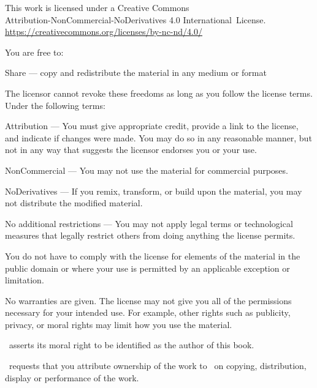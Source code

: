 \cleartorecto
\thispagestyle{plain}

\vspace*{-3\onelineskip}

{\fontsize{8}{10.5}\selectfont%
\setlength{\parindent}{0pt}%
\raggedright\label{copyright-details}%
\setlength{\parskip}{5pt}%

{\centering

{\fontsize{11}{11}\selectfont \ccbyncnd}

This work is licensed under a Creative Commons\\
Attribution-NonCommercial-NoDerivatives 4.0 International~License.\\
\href{https://creativecommons.org/licenses/by-nc-nd/4.0/}{https://creativecommons.org/licenses/by-nc-nd/4.0/}

}

You are free to:

\begin{packeditemize}
\item Share — copy and redistribute the material in any medium or format
\end{packeditemize}

The licensor cannot revoke these freedoms as long as you follow the license terms. Under the following terms:

\begin{packeditemize}
\item Attribution — You must give appropriate credit, provide a link to the license, and indicate if changes were made. You may do so in any reasonable manner, but not in any way that suggests the licensor endorses you or your use.
\item NonCommercial — You may not use the material for commercial purposes.
\item NoDerivatives — If you remix, transform, or build upon the material, you may not distribute the modified material.
\end{packeditemize}

No additional restrictions — You may not apply legal terms or technological measures that legally restrict others from doing anything the license permits.

You do not have to comply with the license for elements of the material in the public domain or where your use is permitted by an applicable exception or limitation.

No warranties are given. The license may not give you all of the permissions necessary for your intended use. For example, other rights such as publicity, privacy, or moral rights may limit how you use the material.

\thePublisher\ asserts its moral right to be identified as the author of this book.

\thePublisher\ requests that you attribute ownership of the work to \thePublisher\ on copying, distribution, display or performance of the work.

}
